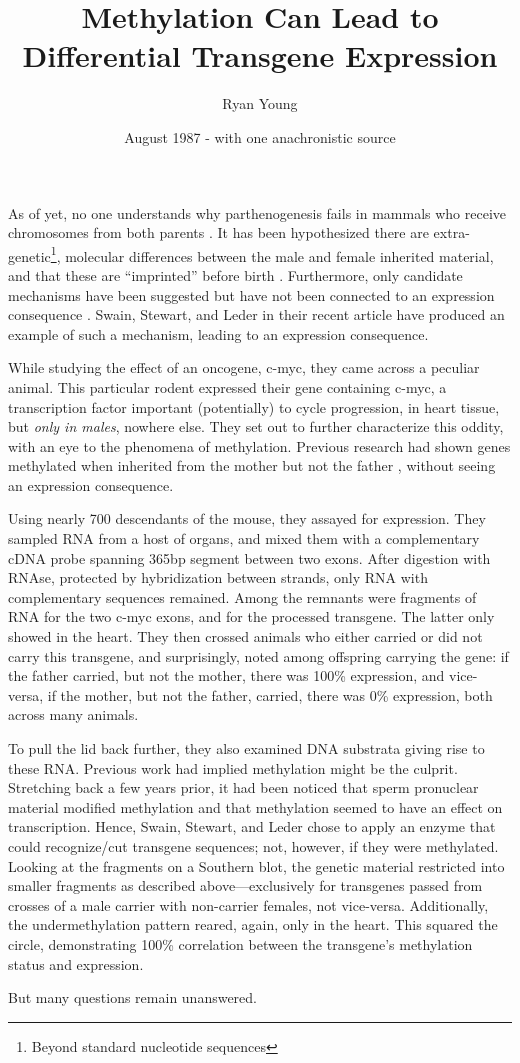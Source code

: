 \documentclass[twocolumn]{article}
\title{{\Large Methylation Can Lead to Differential Transgene Expression}}
\author{\large Ryan Young}
\date{August 1987 - with one anachronistic source}
\begin{document}
\maketitle


As of yet, no one understands why parthenogenesis fails in mammals who receive chromosomes from both parents \citep{solter}\citep{surani}. It has been hypothesized there are extra-genetic\footnote{Beyond standard nucleotide sequences}, molecular differences between the male and female inherited material, and that these are ``imprinted'' before birth \citep{surani}. Furthermore, only candidate mechanisms have been suggested but have not been connected to an expression consequence \citep{reik}. Swain, Stewart, and Leder in their recent article have produced an example of such a mechanism, leading to an expression consequence.

While studying the effect of an oncogene, c-myc, they came across a peculiar animal. This particular rodent expressed their gene containing c-myc, a transcription factor important (potentially) to cycle progression\citep{cymc}, in heart tissue, but \textit{only in males}, nowhere else. They set out to further characterize this oddity, with an eye to the phenomena of methylation. Previous research had shown genes methylated when inherited from the mother but not the father \citep{surani}, without seeing an expression consequence.

Using nearly 700 descendants of the mouse, they assayed for expression. They sampled RNA
from a host of organs, and mixed them with a complementary cDNA probe spanning 365bp segment between two exons. After digestion with RNAse, protected by hybridization between strands, only RNA with complementary sequences remained. Among the remnants were fragments of RNA for the two c-myc exons, and for the processed transgene. The latter only showed in the heart. They then crossed animals who either carried or did not carry this transgene, and surprisingly, noted among offspring carrying the gene: if the father carried, but not the mother, there was 100\% expression, and vice-versa, if the mother, but not the father, carried, there was 0\% expression, both across many animals. 

To pull the lid back further, they also examined DNA substrata giving rise to these RNA. Previous work had implied methylation might be the culprit. Stretching back a few years prior, it had been noticed that sperm pronuclear material modified methylation\citep{} and that methylation seemed to have an effect on transcription\citep{}. Hence, Swain, Stewart, and Leder chose to apply an enzyme that could recognize/cut transgene sequences; not, however, if they were methylated. Looking at the fragments on a Southern blot, the genetic material restricted into smaller fragments as described above---exclusively for transgenes passed from crosses of a male carrier with non-carrier females, not vice-versa. Additionally, the undermethylation pattern reared, again, only in the heart. This squared the circle, demonstrating 100\% correlation between the transgene's methylation status and expression.

But many questions remain unanswered. 



 

\end{document}

